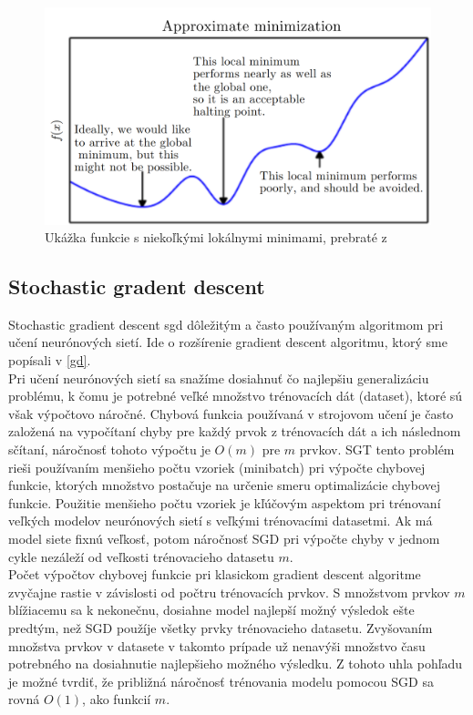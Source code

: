\begin{figure}[H]
	\centering
	\includegraphics[width=0.75\linewidth]{img/gdglobalmin}
	\caption{Ukážka funkcie s niekoľkými lokálnymi minimami, prebraté z\cite[s.~85]{goodfellow2016deep}}
	\label{fig:gd_global_min}
\end{figure}

\subsection{Stochastic gradent descent} \label{l:sgt}
Stochastic gradient descent \acrshort{sgd} dôležitým a často používaným algoritmom pri učení neurónových sietí.
Ide o rozšírenie gradient descent algoritmu, ktorý sme popísali v \ref{gd}.\cite{goodfellow2016deep} \\

\indent Pri učení neurónových sietí sa snažíme dosiahnuť čo najlepšiu generalizáciu problému, k čomu je potrebné veľké množstvo trénovacích dát (dataset), ktoré sú však výpočtovo náročné.
Chybová funkcia používaná v strojovom učení je často založená na vypočítaní chyby pre každý prvok z trénovacích dát a ich následnom sčítaní, náročnosť tohoto výpočtu je $O(m)$ pre $m$ prvkov.
SGT tento problém rieši používaním menšieho počtu vzoriek (minibatch) pri výpočte chybovej funkcie, ktorých množstvo postačuje na určenie smeru optimalizácie chybovej funkcie. 
Použitie menšieho počtu vzoriek je kľúčovým aspektom pri trénovaní veľkých modelov neurónových sietí s veľkými trénovacími datasetmi.
Ak má model siete fixnú veľkosť, potom náročnosť SGD pri výpočte chyby v jednom cykle nezáleží od veľkosti trénovacieho datasetu $m$. \\

\indent Počet výpočtov chybovej funkcie pri klasickom gradient descent algoritme zvyčajne rastie v závislosti od počtru trénovacích prvkov.
S množstvom prvkov $m$ blížiacemu sa k nekonečnu, dosiahne model najlepší možný výsledok ešte predtým, než SGD použíje všetky prvky trénovacieho datasetu.
Zvyšovaním množstva prvkov v datasete v takomto prípade už nenavýši množstvo času potrebného na dosiahnutie najlepšieho možného výsledku.
Z tohoto uhla pohľadu je možné tvrdiť, že približná náročnosť trénovania modelu pomocou SGD sa rovná $O(1)$, ako funkcií $m$.\cite{goodfellow2016deep}

